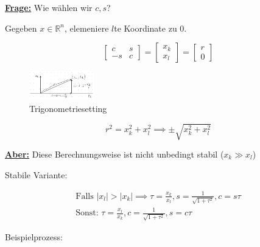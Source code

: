\documentclass{book}
\def\R{\mathbb{R}}
\begin{document}
        \underline{\textbf{Frage:}} Wie wählen wir $c,s$? 
        
        Gegeben $x\in\R^n$, elemeniere $l$te Koordinate zu $0$.

        \[\begin{bmatrix}
            c & s\\ -s & c
        \end{bmatrix}=\begin{bmatrix}
            x_k\\ x_l
        \end{bmatrix}=\begin{bmatrix}
            r\\0
        \end{bmatrix}\]

        \begin{figure}[H]
            \centering
            \includegraphics[width=0.25\textwidth]{Bild008}
            \caption{Trigonometriesetting}
        \end{figure}

        \begin{equation*}
            r^2=x_k^2+x_l^2
            \implies \pm \sqrt{x_k^2+x_l^2}
        \end{equation*}

        \underline{\textbf{Aber:}} Diese Berechnungsweise ist nicht unbedingt stabil ($x_k\gg x_l$)

        Stabile Variante:


        \begin{equation}\label{e2.3}
            \begin{array}{c}
                \text{Falls }\left\vert x_l \right\vert>\left\vert x_k \right\vert\implies \tau =\frac{x_k}{x_l},s=\frac{1}{\sqrt{1+\tau^2}},c=s\tau\\
                \text{Sonst: }\tau=\frac{x_l}{x_k},c=\frac{1}{\sqrt{1+\tau^2}},s=c\tau
            \end{array}
        \end{equation}
       

        Beispielprozess:
\end{document}
